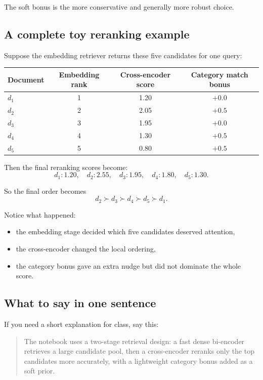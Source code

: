 \documentclass[10pt]{article}
\begin{document}
The soft bonus is the more conservative and generally more robust choice.

\subsection{A complete toy reranking example}

Suppose the embedding retriever returns these five candidates for one query:
\begin{center}
\begin{tabular}{@{}lccc@{}}
\toprule
Document & Embedding rank & Cross-encoder score & Category match bonus \\
\midrule
\(d_1\) & 1 & 1.20 & \(+0.0\) \\
\(d_2\) & 2 & 2.05 & \(+0.5\) \\
\(d_3\) & 3 & 1.95 & \(+0.0\) \\
\(d_4\) & 4 & 1.30 & \(+0.5\) \\
\(d_5\) & 5 & 0.80 & \(+0.5\) \\
\bottomrule
\end{tabular}
\end{center}

Then the final reranking scores become:
\[
d_1:1.20,\quad d_2:2.55,\quad d_3:1.95,\quad d_4:1.80,\quad d_5:1.30.
\]

So the final order becomes
\[
d_2 \succ d_3 \succ d_4 \succ d_5 \succ d_1.
\]

Notice what happened:
\begin{itemize}
    \item the embedding stage decided which five candidates deserved attention,
    \item the cross-encoder changed the local ordering,
    \item the category bonus gave an extra nudge but did not dominate the whole score.
\end{itemize}

\subsection{What to say in one sentence}

If you need a short explanation for class, say this:
\begin{quote}
The notebook uses a two-stage retrieval design: a fast dense bi-encoder retrieves a large candidate pool, then a cross-encoder reranks only the top candidates more accurately, with a lightweight category bonus added as a soft prior.
\end{quote}
\end{document}
